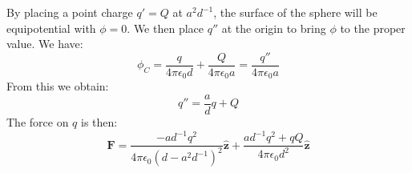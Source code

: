                 \begin{solution}
                    By placing a point charge $q'=Q$ at
                    $a^{2}d^{\minus{1}}$, the surface of the sphere
                    will be equipotential with $\phi=0$. We then place
                    $q''$ at the origin to bring $\phi$ to the proper
                    value. We have:
                    \begin{equation}
                        \phi_{C}=\frac{q}{4\pi\epsilon_{0}d}+
                            \frac{Q}{4\pi\epsilon_{0}a}
                        =\frac{q''}{4\pi\epsilon_{0}a}
                    \end{equation}
                    From this we obtain:
                    \begin{equation}
                        q''=\frac{a}{d}q+Q
                    \end{equation}
                    The force on $q$ is then:
                    \begin{equation}
                        \mathbf{F}=
                        \frac{\minus{a}d^{\minus{1}}q^{2}}
                            {4\pi\epsilon_{0}(d-a^{2}d^{\minus{1}})^{2}}
                        \hat{\mathbf{z}}+
                        \frac{ad^{\minus{1}}q^{2}+qQ}
                            {4\pi\epsilon_{0}d^{2}}
                        \hat{\mathbf{z}}
                    \end{equation}
                \end{solution}
